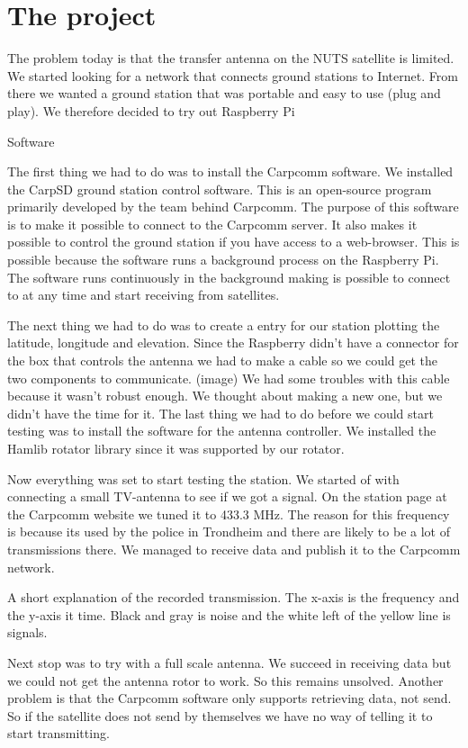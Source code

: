 \chapter{The project}
\label{chap:the_project}




The problem today is that the transfer antenna on the NUTS satellite is limited. We started looking for a network that connects ground stations to Internet. From there we wanted a ground station that was portable and easy to use (plug and play). We therefore decided to try out Raspberry Pi 

Software

The first thing we had to do was to install the Carpcomm software. We installed the CarpSD ground station control software. This is an open-source program primarily developed by the team behind Carpcomm. The purpose of this software is to make it possible to connect to the Carpcomm server. It also makes it possible to control the ground station if you have access to a web-browser. This is possible because the software runs a background process on the Raspberry Pi. The software runs continuously in the background making is possible to connect to at any time and start receiving from satellites. 

The next thing we had to do was to create a entry for our station plotting the latitude, longitude and elevation.    
Since the Raspberry didn’t have a connector for the box that controls the antenna we had to make a cable so we could get the two components to communicate. (image) 
We had some troubles with this cable because it wasn't robust enough. We thought about making a new one, but we didn't have the time for it. 
The last thing we had to do before we could start testing was to install the software for the antenna controller. We installed the Hamlib rotator library since it was supported by our rotator. 

Now everything was set to start testing the station. We started of with connecting a small TV-antenna to see if we got a signal. On the station page at the Carpcomm website we tuned it to 433.3 MHz. The reason for this  frequency is because its used by the police in Trondheim and there are likely to be a lot of transmissions there.  We managed to receive data and publish it to the Carpcomm network.


A short explanation of the recorded transmission. The x-axis is the frequency and the y-axis it time. Black and gray is noise and the white left of the yellow line is signals.  

 Next stop was to try with a full scale antenna. We succeed in receiving data but we could not get the antenna rotor to work. So this remains unsolved. Another problem is that the Carpcomm software only supports retrieving data, not send. So if the satellite does not send by themselves we have no way of telling it to start transmitting. 




